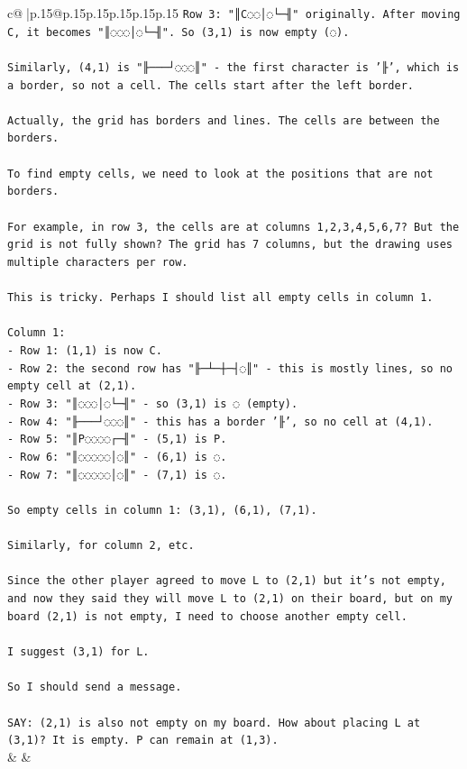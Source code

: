 \documentclass{article}
\begin{document}
{\begin{supertabular}{c@{$\;$}|p{.15\linewidth}@{}p{.15\linewidth}p{.15\linewidth}p{.15\linewidth}p{.15\linewidth}p{.15\linewidth}}
{{{\texttt{Row 3: "║C◌◌│◌└─╢" originally. After moving C, it becomes "║◌◌◌│◌└─╢". So (3,1) is now empty (◌).} \\
\\ 
\texttt{Similarly, (4,1) is "╟───┘◌◌◌║" {-} the first character is '╟', which is a border, so not a cell. The cells start after the left border.} \\
\\ 
\texttt{Actually, the grid has borders and lines. The cells are between the borders.} \\
\\ 
\texttt{To find empty cells, we need to look at the positions that are not borders.} \\
\\ 
\texttt{For example, in row 3, the cells are at columns 1,2,3,4,5,6,7? But the grid is not fully shown? The grid has 7 columns, but the drawing uses multiple characters per row.} \\
\\ 
\texttt{This is tricky. Perhaps I should list all empty cells in column 1.} \\
\\ 
\texttt{Column 1:} \\
\texttt{{-} Row 1: (1,1) is now C.} \\
\texttt{{-} Row 2: the second row has "╟─┴─┼─┤◌║" {-} this is mostly lines, so no empty cell at (2,1).} \\
\texttt{{-} Row 3: "║◌◌◌│◌└─╢" {-} so (3,1) is ◌ (empty).} \\
\texttt{{-} Row 4: "╟───┘◌◌◌║" {-} this has a border '╟', so no cell at (4,1).} \\
\texttt{{-} Row 5: "║P◌◌◌◌┌─╢" {-} (5,1) is P.} \\
\texttt{{-} Row 6: "║◌◌◌◌◌│◌║" {-} (6,1) is ◌.} \\
\texttt{{-} Row 7: "║◌◌◌◌◌│◌║" {-} (7,1) is ◌.} \\
\\ 
\texttt{So empty cells in column 1: (3,1), (6,1), (7,1).} \\
\\ 
\texttt{Similarly, for column 2, etc.} \\
\\ 
\texttt{Since the other player agreed to move L to (2,1) but it's not empty, and now they said they will move L to (2,1) on their board, but on my board (2,1) is not empty, I need to choose another empty cell.} \\
\\ 
\texttt{I suggest (3,1) for L.} \\
\\ 
\texttt{So I should send a message.} \\
\\ 
\texttt{SAY: (2,1) is also not empty on my board. How about placing L at (3,1)? It is empty. P can remain at (1,3).} \\
            }
        }
    }
    & & \\ \\


\end{supertabular}}
\end{document}
